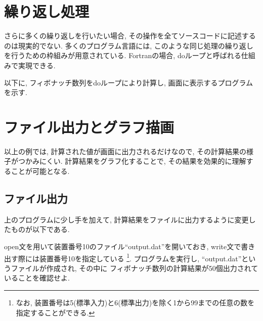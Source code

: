 \section{繰り返し処理}
さらに多くの繰り返しを行いたい場合, その操作を全てソースコードに記述するのは現実的でない.
多くのプログラム言語には, このような同じ処理の繰り返しを行うための枠組みが用意されている.
Fortranの場合, {\ttfamily do}ループと呼ばれる仕組みで実現できる.

以下に, フィボナッチ数列を{\ttfamily do}ループにより計算し, 画面に表示するプログラムを示す.


\fi



\section{ファイル出力とグラフ描画}
以上の例では, 計算された値が画面に出力されるだけなので, その計算結果の様子がつかみにくい.
計算結果をグラフ化することで, その結果を効果的に理解することが可能となる.




\subsection*{ファイル出力}
上のプログラムに少し手を加えて, 計算結果をファイルに出力するように変更したものが以下である.
%


open文を用いて装置番号10のファイル``output.dat''を開いておき,
write文で書き出す際には装置番号10を指定している
\footnote{
なお, 装置番号は5(標準入力)と6(標準出力)を除く1から99までの任意の数を指定することができる.
}.
プログラムを実行し, ``output.dat''というファイルが作成され, その中に
フィボナッチ数列の計算結果が50個出力されていることを確認せよ.


